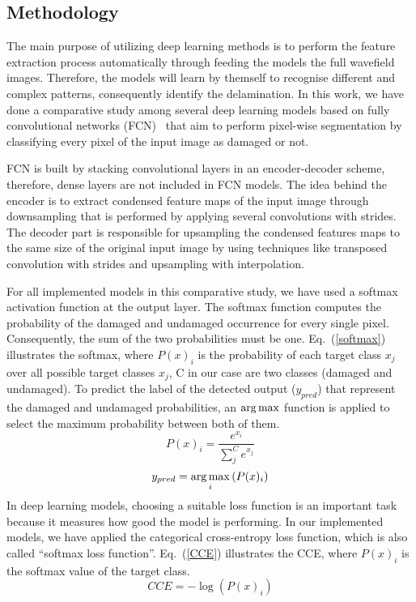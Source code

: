 \subsection{Methodology}
The main purpose of utilizing deep learning methods is to perform the feature extraction process automatically through feeding the models the full wavefield images.
Therefore, the models will learn by themself to recognise different and complex patterns, consequently identify the delamination. 
In this work, we have done a comparative study among several deep learning models based on fully convolutional networks (FCN)~\cite{shelhamer2017fully} that aim to perform pixel-wise segmentation by classifying every pixel of the input image as damaged or not. 

FCN is built by stacking convolutional layers in an encoder-decoder scheme, therefore, dense layers are not included in FCN models. 
The idea behind the encoder is to extract condensed feature maps of the input image through downsampling that is performed by applying several convolutions with strides.
The decoder part is responsible for upsampling the condensed features maps to the same size of the original input image by using techniques like transposed convolution with strides and upsampling with interpolation.


For all implemented models in this comparative study, we have used a softmax activation function at the output layer.
The softmax function computes the probability of the damaged and undamaged occurrence for every single pixel.
Consequently, the sum of the two probabilities must be one. 
Eq.~(\ref{softmax}) illustrates the softmax, where \(P(x)_{i}\) is the probability of each target class \(x_{j}\) over all possible target classes \(x_{j}\), C in our case are two classes  (damaged and undamaged).
To predict the label of the detected output (\(y_{pred}\)) that represent the damaged and undamaged probabilities, an \(\operatorname*{arg\,max}\) function is applied to select the maximum probability between both of them.
	\begin{equation}
		P(x)_{i} = \frac{e^{x_{i}}}{\sum_{j}^{C} e^{x_{j}}}
		\label{softmax}
	\end{equation} 
	\begin{equation}
		y_{pred} = \operatorname*{arg\,max}_{i}\left( P(x)_{i} \right)
		\label{argmax}
	\end{equation}
In deep learning models, choosing a suitable loss function is an important task because it measures how good the model is performing.
In our implemented models, we have applied the categorical cross-entropy loss function, which is also called \enquote{softmax loss function}.
Eq.~(\ref{CCE}) illustrates the CCE, where \( P(x)_{i}\) is the softmax value of the target class. 
	\begin{equation}
	CCE = -\log\left( P(x)_{i} \right)
	\label{CCE}
	\end{equation}


